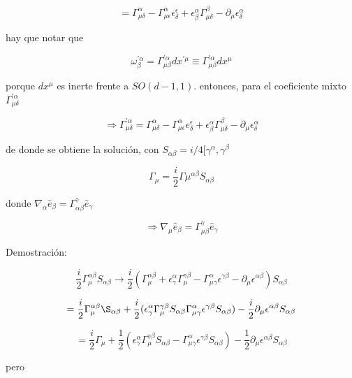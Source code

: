 \documentclass{report}
\begin{document}
{\[=\Gamma_{\mu \delta}^{\alpha} - \Gamma_{\mu \epsilon}^{\alpha} \epsilon_{\delta}^{\epsilon} + \epsilon_{\beta}^{\alpha} \Gamma_{\mu \delta}^{\beta} - \partial_{\mu} \epsilon_{\delta}^{\alpha}\]

hay que notar que

\[\omega_{\beta}^{\prime \alpha} = \Gamma_{\mu \beta}^{\prime \alpha }dx^{\prime \mu } \equiv \Gamma_{\mu \beta}^{\prime \alpha} dx^{\mu}\]

porque $dx^{\mu}$ es inerte frente a $SO(d-1,1)$. entonces, para el coeficiente mixto $\Gamma_{\mu \delta}^{\prime \alpha }$

\[\Rightarrow \Gamma_{\mu \delta}^{\prime \alpha} = \Gamma_{\mu \delta}^{\alpha} - \Gamma_{\mu \epsilon}^{\alpha} e
_{\delta}^{\epsilon} + \epsilon_{\beta}^{\alpha} \Gamma_{\mu \delta}^{\beta} - \partial_{\mu} \epsilon_{\delta}^{\alpha}\]

de donde se obtiene la solución, con $S_{\alpha \beta} = i/4 [\gamma ^{\alpha} , \gamma^{\beta}$

\begin{equation}
\Gamma_{\mu} = \frac{i}{2} \Gamma{\mu}^{\alpha \beta} S_{\alpha\beta} 
\end{equation}

donde $\nabla _{\alpha} \hat{e}_{\beta} = \Gamma_{\alpha \beta}^{\gamma} \hat{e}_{\gamma}$

\[\Rightarrow \nabla_{\mu} \hat{e}_{\beta} = \Gamma_{\mu \beta}^{\gamma} \hat{e}_{\gamma}\]

Demostración: 

\[\frac{i}{2} \Gamma_{\mu}^{\alpha \beta} S_{\alpha \beta} \rightarrow \frac{i}{2}(\Gamma_{\mu}^{\alpha \beta} + \epsilon_{\gamma}^{\alpha} \Gamma_{\mu}^{\gamma \beta} - \Gamma_{\mu \gamma}^{\alpha} \epsilon^{\gamma \beta} - \partial_{\mu} \epsilon ^{\alpha \beta})S_{\alpha \beta} \]

\[= \frac{i}{2} \Gamma_{\mu}^{\alpha \beta} \S_{\alpha \beta }  + \frac{i}{2} (\epsilon_{\gamma}^{\alpha} \Gamma_{\mu}^{\gamma \beta }S_{\alpha \beta}  \Gamma_{\mu \gamma}^{\alpha} \epsilon^{\gamma \beta} S_{\alpha \beta}) - \frac{i}{2} \partial_{\mu} \epsilon^{\alpha \beta } S_{\alpha \beta}\]

\[= \frac{i}{2} \Gamma_{\mu} + \frac{1}{2} (\epsilon_{\gamma}^{\alpha} \Gamma_{\mu}^{\gamma \beta} S_{\alpha \beta} - \Gamma_{\mu \gamma}^{\alpha} \epsilon^{\gamma \beta} S_{\alpha \beta}) - \frac{1}{2} \partial_{\mu} \epsilon^{\alpha \beta} S_{\alpha \beta }\]

pero

}
\end{document}
